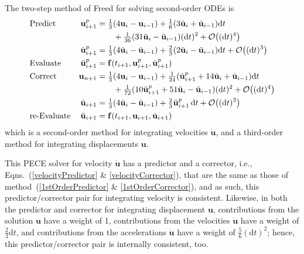 The two-step method of Freed \cite{Freed17a} for solving second-order ODEs is
\begin{subequations}
    \label{pairedMethods}
    \begin{align}
    \mbox{} & \text{Predict} &
    \mathbf{u}_{i+1}^p & = \tfrac{1}{3} (
    4 \mathbf{u}_i - \mathbf{u}_{i-1} ) + 
    \tfrac{1}{6} ( 3 \dot{\mathbf{u}}_i + 
    \dot{\mathbf{u}}_{i-1} ) \mathrm{d}t \notag \\ 
    \mbox{} & & & \qquad + 
    \tfrac{1}{36} ( 31 \ddot{\mathbf{u}}_i - 
    \ddot{\mathbf{u}}_{i-1} ) (\mathrm{d}t)^2 + 
    \mathcal{O} \bigl( (\mathrm{d}t)^4 \bigr) 
    \label{displacementPredictor} \\
    \mbox{} & &
    \dot{\mathbf{u}}_{i+1}^p & = \tfrac{1}{3} 
    ( 4 \dot{\mathbf{u}}_i - \dot{\mathbf{u}}_{i-1} ) + 
    \tfrac{2}{3} ( 2\ddot{\mathbf{u}}_i - \ddot{\mathbf{u}}_{i-1} )
    \mathrm{d}t + \mathcal{O} \bigl( (\mathrm{d}t)^3 \bigr)
    \label{velocityPredictor} \\
    \mbox{} & \text{Evaluate} &
    \ddot{\mathbf{u}}^p_{i+1} & = \mathbf{f} (t_{i+1}, \mathbf{u}^p_{i+1}, \dot{\mathbf{u}}^p_{i+1}) 
    \label{2ndEvaluate} \\
    \mbox{} & \text{Correct} & 
    \mathbf{u}_{n+1} & = \tfrac{1}{3} (
    4  \mathbf{u}_i - \mathbf{u}_{i-1} ) +
    \tfrac{1}{24} ( \dot{\mathbf{u}}^p_{i+1} +
    14 \dot{\mathbf{u}}_i + \dot{\mathbf{u}}_{i-1} ) \mathrm{d}t 
    \notag \\
    \mbox{} & & & \qquad +
    \tfrac{1}{72} ( 10 \ddot{\mathbf{u}}^p_{i+1} + 
    51 \ddot{\mathbf{u}}_i - \ddot{\mathbf{u}}_{i-1} ) (\mathrm{d}t)^2 + 
    \mathcal{O} \bigl( (\mathrm{d}t)^4 \bigr)
    \label{displacementCorrector} \\ 
    \mbox{} & &
    \dot{\mathbf{u}}_{i+1} & = \tfrac{1}{3} 
    ( 4 \dot{\mathbf{u}}_i - \dot{\mathbf{u}}_{i-1} ) + 
    \tfrac{2}{3} \ddot{\mathbf{u}}^p_{i+1} \, \mathrm{d}t + 
    \mathcal{O} \bigl( (\mathrm{d}t)^3 \bigr)
    \label{velocityCorrector} \\
    \mbox{} & \text{re-Evaluate} & 
    \ddot{\mathbf{u}}_{i+1} & = \mathbf{f} (t_{i+1}, \mathbf{u}_{i+1}, \dot{\mathbf{u}}_{i+1})
    \label{2ndReEvaluate}
    \end{align}
\end{subequations}
which is a second-order method for integrating velocities $\dot{\mathbf{u}}$, and a third-order method for integrating displacements $\mathbf{u}$.  

This PECE solver for velocity $\dot{\mathbf{u}}$ has a predictor and a corrector, i.e., Eqns.~(\ref{velocityPredictor} \& \ref{velocityCorrector}), that are the same as those of method~(\ref{1stOrderPredictor} \& \ref{1stOrderCorrector}), and as such, this predictor\slash corrector pair for integrating velocity is consistent.  Likewise, in both the predictor and corrector for integrating displacement $\mathbf{u}$, contributions from the solution $\mathbf{u}$ have a weight of 1, contributions from the velocities $\dot{\mathbf{u}}$ have a weight of $\tfrac{2}{3} \mathrm{d}t$, and contributions from the accelerations $\ddot{\mathbf{u}}$ have a weight of $\tfrac{5}{6} (\mathrm{d}t)^2$; hence, this predictor\slash corrector pair is internally consistent, too.

